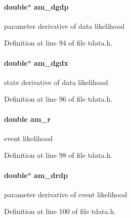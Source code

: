 \hypertarget{struct_temp_data_a946de8c8ec9eaf3bae2c3cb5229e5608}{}
\paragraph[{am\+\_\+dgdp}]{\setlength{\rightskip}{0pt plus 5cm}double$\ast$ am\+\_\+dgdp}\label{struct_temp_data_a946de8c8ec9eaf3bae2c3cb5229e5608}
parameter derivative of data likelihood 

Definition at line 94 of file tdata.\+h.

\hypertarget{struct_temp_data_a48ffc7d550f3a08efce20d54ebac8d6a}{}
\paragraph[{am\+\_\+dgdx}]{\setlength{\rightskip}{0pt plus 5cm}double$\ast$ am\+\_\+dgdx}\label{struct_temp_data_a48ffc7d550f3a08efce20d54ebac8d6a}
state derivative of data likelihood 

Definition at line 96 of file tdata.\+h.

\hypertarget{struct_temp_data_a7a652bd44d3d6f8ffa106a5295f5e2a1}{}
\paragraph[{am\+\_\+r}]{\setlength{\rightskip}{0pt plus 5cm}double am\+\_\+r}\label{struct_temp_data_a7a652bd44d3d6f8ffa106a5295f5e2a1}
event likelihood 

Definition at line 98 of file tdata.\+h.

\hypertarget{struct_temp_data_af40e5e8e0a65436934e4f2888340e458}{}
\paragraph[{am\+\_\+drdp}]{\setlength{\rightskip}{0pt plus 5cm}double$\ast$ am\+\_\+drdp}\label{struct_temp_data_af40e5e8e0a65436934e4f2888340e458}
parameter derivative of event likelihood 

Definition at line 100 of file tdata.\+h.

\hypertarget{struct_temp_data_a0fb069ba24e8e90df621dd29ec4c84f7}{}
